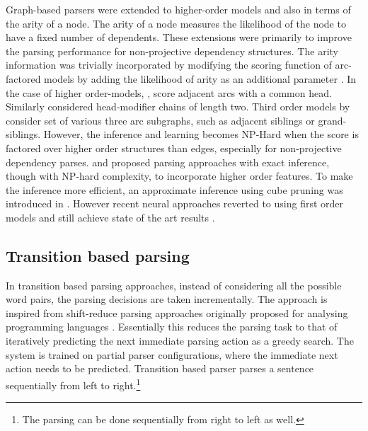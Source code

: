 \documentclass[11pt]{article}
\begin{document}
 




Graph-based parsers were extended to higher-order models and also in terms of the arity of a node. The arity of a node  measures the likelihood of the node to have a fixed number of dependents.  These extensions were primarily to improve the parsing performance for non-projective dependency structures. The arity information was  trivially incorporated by modifying the scoring function of arc-factored models by adding the likelihood of arity as an additional parameter \cite{kubler2009dependency}. In the case of higher order-models, , score adjacent arcs with a common head. Similarly  considered head-modifier chains of length two. Third order models by  consider set of various three arc subgraphs, such as adjacent siblings or grand-siblings. However, the inference and learning becomes NP-Hard \cite{mcdonald-satta-2007-complexity} when the score is factored over higher order structures than edges, especially for non-projective dependency parses.  and  proposed parsing approaches with exact inference, though with NP-hard complexity, to incorporate higher order features. To make the inference more efficient, an approximate inference using cube pruning was introduced in . However recent neural approaches reverted to using first order models and still achieve state of the art results \cite{kulmizev-etal-2019-deep}.

\subsection{Transition based parsing}

In transition based parsing approaches, instead of considering all the possible word pairs, the parsing decisions are taken incrementally.  The approach is  inspired from shift-reduce parsing approaches originally proposed for analysing programming languages \cite{10.5555/578789Ullman}.  Essentially this reduces the parsing task to that of iteratively predicting the next immediate parsing action as a greedy search. The system is trained on partial parser configurations, where  the immediate next action needs to be predicted. Transition based parser parses a sentence sequentially from left to right.\footnote{The parsing can be done sequentially from right to left as well.} 
\end{document}
